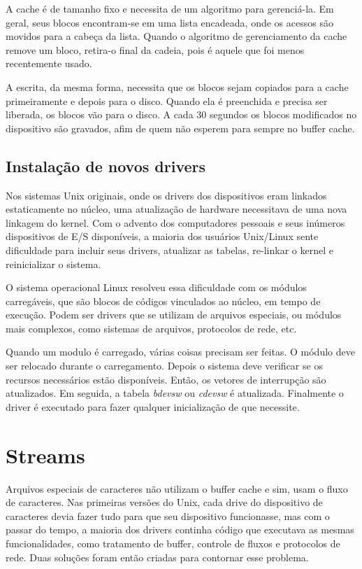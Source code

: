 A cache é de tamanho fixo e necessita de um algoritmo para gerenciá-la. Em geral, seus blocos encontram-se em uma lista encadeada, onde os acessos são movidos para a cabeça da lista. Quando o algoritmo de gerenciamento da cache remove um bloco, retira-o final da cadeia, pois é aquele que foi menos recentemente usado.

A escrita, da mesma forma, necessita que os blocos sejam copiados para a cache primeiramente e depois para o disco. Quando ela é preenchida e precisa ser liberada, os blocos vão para o disco. A cada 30 segundos os blocos modificados no dispositivo são gravados, afim de quem não esperem para sempre no buffer cache.

\subsection{Instalação de novos drivers}

Nos sistemas Unix originais, onde os drivers dos dispositivos eram linkados estaticamente no núcleo, uma atualização de hardware necessitava de uma nova linkagem do kernel. Com o advento dos computadores pessoais e seus inúmeros dispositivos de E/S disponíveis, a maioria dos usuários Unix/Linux sente dificuldade para incluir seus drivers, atualizar as tabelas, re-linkar o kernel e reinicializar o sistema.

O sistema operacional Linux resolveu essa dificuldade com os módulos carregáveis, que são blocos de códigos vinculados ao núcleo, em tempo de execução. Podem ser drivers que se utilizam de arquivos especiais, ou módulos mais complexos, como sistemas de arquivos, protocolos de rede, etc.

Quando um modulo é carregado, várias coisas precisam ser feitas. O módulo deve ser relocado durante o carregamento. Depois o sistema deve verificar se os recursos necessários estão disponíveis. Então, os vetores de interrupção são atualizados. Em seguida, a tabela \emph{bdevsw} ou \emph{cdevsw} é atualizada. Finalmente o driver é executado para fazer qualquer inicialização de que necessite.

\section{Streams}

Arquivos especiais de caracteres não utilizam o buffer cache e sim, usam o fluxo de caracteres. Nas primeiras versões do Unix, cada drive do dispositivo de caracteres devia fazer tudo para que seu dispositivo funcionasse, mas com o passar do tempo, a maioria dos drivers continha código que executava as mesmas funcionalidades, como tratamento de buffer, controle de fluxos e protocolos de rede. Duas soluções foram então criadas para contornar esse problema.

